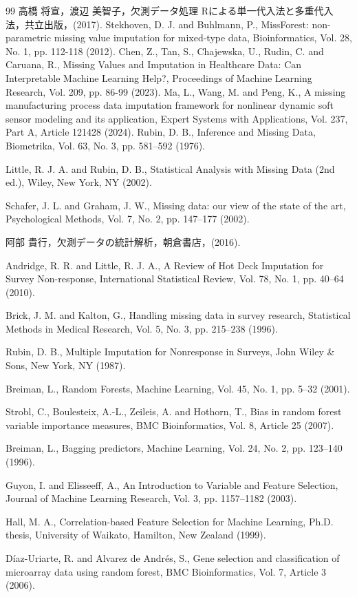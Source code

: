 \documentclass[autodetect-engine,dvipdfmx,platex]{deimj}
\begin{document}
\begin{thebibliography}{99}
  高橋 将宣，渡辺 美智子，欠測データ処理 Rによる単一代入法と多重代入法，共立出版，(2017).
  Stekhoven, D. J. and Buhlmann, P., MissForest: non-parametric missing value imputation for mixed-type data, Bioinformatics, Vol. 28, No. 1, pp. 112-118 (2012). 
Chen, Z., Tan, S., Chajewska, U., Rudin, C. and Caruana, R., Missing Values and Imputation in Healthcare Data: Can Interpretable Machine Learning Help?, Proceedings of Machine Learning Research, Vol. 209, pp. 86-99 (2023).
Ma, L., Wang, M. and Peng, K., A missing manufacturing process data imputation framework for nonlinear dynamic soft sensor modeling and its application, Expert Systems with Applications, Vol. 237, Part A, Article 121428 (2024).
  Rubin, D. B., Inference and Missing Data, Biometrika, Vol. 63, No. 3, pp. 581--592 (1976).

  Little, R. J. A. and Rubin, D. B., Statistical Analysis with Missing Data (2nd ed.), Wiley, New York, NY (2002).

  Schafer, J. L. and Graham, J. W., Missing data: our view of the state of the art, Psychological Methods, Vol. 7, No. 2, pp. 147--177 (2002).

  阿部 貴行，欠測データの統計解析，朝倉書店，(2016).

  Andridge, R. R. and Little, R. J. A., A Review of Hot Deck Imputation for Survey Non-response, International Statistical Review, Vol. 78, No. 1, pp. 40--64 (2010).

  Brick, J. M. and Kalton, G., Handling missing data in survey research, Statistical Methods in Medical Research, Vol. 5, No. 3, pp. 215--238 (1996).

  Rubin, D. B., Multiple Imputation for Nonresponse in Surveys, John Wiley \& Sons, New York, NY (1987).

  Breiman, L., Random Forests, Machine Learning, Vol. 45, No. 1, pp. 5--32 (2001).

  Strobl, C., Boulesteix, A.-L., Zeileis, A. and Hothorn, T., Bias in random forest variable importance measures, BMC Bioinformatics, Vol. 8, Article 25 (2007).

  Breiman, L., Bagging predictors, Machine Learning, Vol. 24, No. 2, pp. 123--140 (1996).

  Guyon, I. and Elisseeff, A., An Introduction to Variable and Feature Selection, Journal of Machine Learning Research, Vol. 3, pp. 1157--1182 (2003).

  Hall, M. A., Correlation-based Feature Selection for Machine Learning, Ph.D. thesis, University of Waikato, Hamilton, New Zealand (1999).

  D{\'i}az-Uriarte, R. and Alvarez de Andr{\'e}s, S., Gene selection and classification of microarray data using random forest, BMC Bioinformatics, Vol. 7, Article 3 (2006).

\end{thebibliography}
\end{document}
